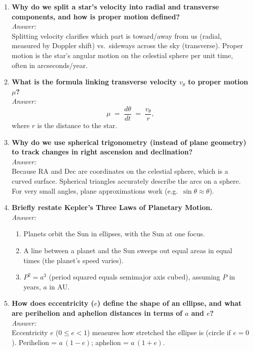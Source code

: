 \begin{enumerate}
  \item \textbf{Why do we split a star’s velocity into radial and transverse components, and how is proper motion defined?}\\
    \emph{Answer:}\\
    Splitting velocity clarifies which part is toward/away from us (radial, measured by Doppler shift) vs.\ sideways across the sky (transverse).
    Proper motion is the star’s angular motion on the celestial sphere per unit time, often in arcseconds/year.

  \item \textbf{What is the formula linking transverse velocity $v_\theta$ to proper motion $\mu$?}\\
    \emph{Answer:}\\
    \[
      \mu \;=\; \frac{d\theta}{dt} \;=\;\frac{v_\theta}{r},
    \]
    where $r$ is the distance to the star.

  \item \textbf{Why do we use spherical trigonometry (instead of plane geometry) to track changes in right ascension and declination?}\\
    \emph{Answer:}\\
    Because RA and Dec are coordinates on the celestial sphere, which is a curved surface. Spherical triangles accurately describe the arcs on a sphere. For very small angles, plane approximations work (e.g.\ $\sin\theta \approx \theta$).

  \item \textbf{Briefly restate Kepler’s Three Laws of Planetary Motion.}\\
    \emph{Answer:}\\
    \begin{enumerate}
      \item Planets orbit the Sun in ellipses, with the Sun at one focus.
      \item A line between a planet and the Sun sweeps out equal areas in equal times (the planet's speed varies).
      \item $P^2 = a^3$ (period squared equals semimajor axis cubed), assuming $P$ in years, $a$ in AU.
    \end{enumerate}

  \item \textbf{How does eccentricity ($e$) define the shape of an ellipse, and what are perihelion and aphelion distances in terms of $a$ and $e$?}\\
    \emph{Answer:}\\
    Eccentricity $e$ ($0 \le e < 1$) measures how stretched the ellipse is (circle if $e=0$).
    Perihelion = $a\,(1 - e)$; aphelion = $a\,(1 + e)$.


\end{enumerate}
